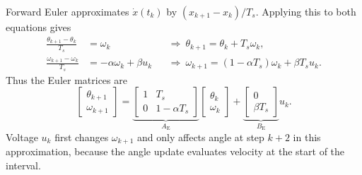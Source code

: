 \documentclass[11pt,a4paper]{article}
\numberwithin{equation}{section}
\numberwithin{figure}{section}
\numberwithin{table}{section}
\begin{document}
Forward Euler approximates $\dot x(t_k)$ by $(x_{k+1}-x_k)/T_s$. Applying this to both equations gives
\begin{align*}
\frac{\theta_{k+1}-\theta_k}{T_s}&=\omega_k
&&\Longrightarrow\ \theta_{k+1}=\theta_k+T_s\omega_k,\\
\frac{\omega_{k+1}-\omega_k}{T_s}&=-\alpha\omega_k+\beta u_k
&&\Longrightarrow\ \omega_{k+1}=(1-\alpha T_s)\omega_k+\beta T_su_k.
\end{align*}
Thus the Euler matrices are
\begin{equation}\label{eq:eulermotor}
\begin{bmatrix}\theta_{k+1}\\\omega_{k+1}\end{bmatrix}
=\underbrace{\begin{bmatrix}1&T_s\\0&1-\alpha T_s\end{bmatrix}}_{A_{\mathrm E}}
\begin{bmatrix}\theta_k\\\omega_k\end{bmatrix}
+\underbrace{\begin{bmatrix}0\\\beta T_s\end{bmatrix}}_{B_{\mathrm E}}u_k.
\end{equation}
Voltage $u_k$ first changes $\omega_{k+1}$ and only affects angle at step $k+2$ in this approximation, because the angle update evaluates velocity at the start of the interval.
\end{document}
